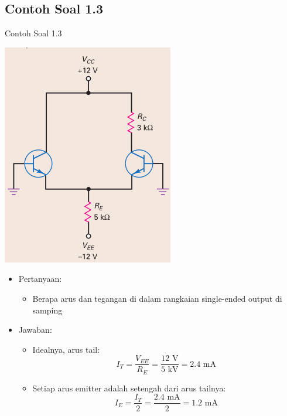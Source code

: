 \documentclass[aspectratio=169]{beamer}
\begin{document}
\subsection{Contoh Soal 1.3}
\begin{frame}{Contoh Soal 1.3}
	\begin{multicols}{2}
		\begin{center}
			\includegraphics[width=0.6\textheight]{gambar/01.latihan_soal_3}
		\end{center}
		\columnbreak
		\begin{itemize}
			\item Pertanyaan:
			\begin{itemize}
				\item Berapa arus dan tegangan di dalam rangkaian single-ended output di samping
			\end{itemize}
			\item Jawaban:
			\begin{itemize}
				\item Idealnya, arus tail:
				\[ I_T = \frac{V_{EE}}{R_E} = \frac{12 \text{ V}}{5 \text{ kV}} = 2.4 \text{ mA} \]
				\item Setiap arus emitter adalah setengah dari arus tailnya:
				\[ I_E = \frac{I_T}{2} = \frac{2.4 \text{ mA}}{2} =1.2 \text{ mA} \]
			\end{itemize}
		\end{itemize}
		\vfill\null
	\end{multicols}
\end{frame}
\end{document}
